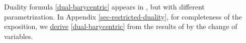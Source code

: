 \documentclass{article} %
\DeclareMathOperator{\Var}{Var}
\DeclareMathOperator{\CVar}{CVar}
\DeclareMathOperator{\Proj}{Proj}
\begin{document}
Duality formula \eqref{dual-barycentric} appears in \citep[]{alibert2019new}, \citep[Theorem 1.2 \& ]{gozlan2020mixture} but with different parametrization. In Appendix \ref{sec-restricted-duality}, for completeness of the exposition, we \underline{derive} \eqref{dual-barycentric} from the results of \citep{gozlan2020mixture} by the change of variables.


\end{document}
